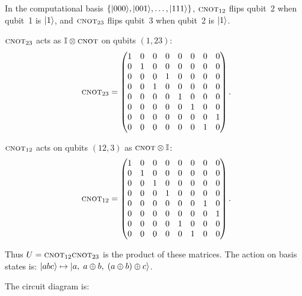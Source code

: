 \documentclass[12pt,oneside]{amsart}
\begin{document}
\begin{exercise}
\end{exercise}
\begin{solution}
  In the computational basis $\{|000\rangle,|001\rangle,\ldots,|111\rangle\}$,
  $\textsc{cnot}_{12}$ flips qubit~2 when qubit~1 is $|1\rangle$, and
  $\textsc{cnot}_{23}$ flips qubit~3 when qubit~2 is $|1\rangle$.

  $\textsc{cnot}_{23}$ acts as $\mathbb{I}\otimes \textsc{cnot}$ on qubits $(1,23)$:
  \[
    \textsc{cnot}_{23} = \begin{pmatrix}
      1&0&0&0&0&0&0&0\\
      0&1&0&0&0&0&0&0\\
      0&0&0&1&0&0&0&0\\
      0&0&1&0&0&0&0&0\\
      0&0&0&0&1&0&0&0\\
      0&0&0&0&0&1&0&0\\
      0&0&0&0&0&0&0&1\\
      0&0&0&0&0&0&1&0
    \end{pmatrix}.
  \]

  $\textsc{cnot}_{12}$ acts on qubits $(12,3)$ as $\textsc{cnot}\otimes \mathbb{I}$:
  \[
    \textsc{cnot}_{12} = \begin{pmatrix}
      1&0&0&0&0&0&0&0\\
      0&1&0&0&0&0&0&0\\
      0&0&1&0&0&0&0&0\\
      0&0&0&1&0&0&0&0\\
      0&0&0&0&0&0&1&0\\
      0&0&0&0&0&0&0&1\\
      0&0&0&0&1&0&0&0\\
      0&0&0&0&0&1&0&0
    \end{pmatrix}.
  \]

  Thus $U = \textsc{cnot}_{12}\textsc{cnot}_{23}$ is the product of these matrices. The
  action on basis states is:
  $|abc\rangle\mapsto|a,\;a\oplus b,\;(a\oplus b)\oplus c\rangle$.

  The circuit diagram is:
  \begin{center}
  \end{center}
\end{solution}
\end{document}
